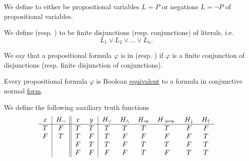 \begin{definition}\label{def:conjunctive_normal_form}
  We define  to either be propositional variables \( L = P \) or negations \( L = \neg P \) of propositional variables.

  We define  (resp. ) to be finite disjunctions (resp. conjunctions) of literals, i.e.
  \begin{equation*}
    L_1 \vee L_2 \vee \ldots \vee L_n.
  \end{equation*}

  We say that a propositional formula \( \varphi \) is in  (resp. ) if \( \varphi \) is a finite conjunction of disjunctions (resp. finite disjunction of conjunctions).
\end{definition}

\begin{proposition}\label{thm:conjunctive_normal_form_reduction}
  Every propositional formula \( \varphi \) is Boolean \hyperref[def:propositional_interpretation]{equivalent} to a formula in conjunctive normal \hyperref[def:conjunctive_normal_form]{form}.
\end{proposition}

\begin{definition}\label{def:truth_functions}
  We define the following auxiliary truth functions
  \begin{equation*}
    \begin{tabular}{c | c || c c | c c c c c c}
      \( x \) & \( H_\neg \) & \( x \) & \( y \) & \( H_\vee \) & \( H_\wedge \) & \( H_\Rightarrow \) & \( H_{\iff} \) & \( H_\downarrow \) & \( H_\uparrow \) \\
      \hline
      \( T \) & \( F \)      & \( T \) & \( T \) & \( T \)      & \( T \)        & \( T \)             & \( T \)        & \( F \)            & \( F \)          \\
      \( F \) & \( T \)      & \( T \) & \( F \) & \( T \)      & \( F \)        & \( F \)             & \( F \)        & \( F \)            & \( T \)          \\
              &              & \( F \) & \( T \) & \( T \)      & \( F \)        & \( T \)             & \( T \)        & \( F \)            & \( T \)          \\
              &              & \( F \) & \( F \) & \( F \)      & \( F \)        & \( T \)             & \( F \)        & \( T \)            & \( T \)
    \end{tabular}
  \end{equation*}
\end{definition}

